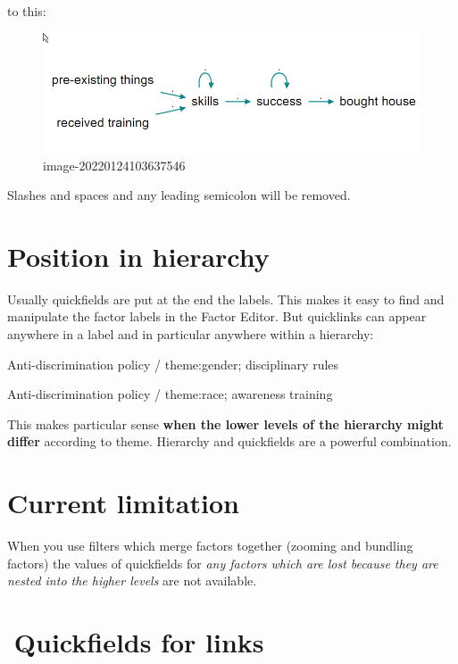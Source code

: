 \documentclass[
]{book}
\begin{document}
to this:

\begin{figure}
\centering
\includegraphics[width=6.77083in,height=\textheight]{_assets/image-20220124103637546.png}
\caption{image-20220124103637546}
\end{figure}

Slashes and spaces and any leading semicolon will be removed.

\hypertarget{position-in-hierarchy}{%
\section{Position in hierarchy}\label{position-in-hierarchy}}

Usually quickfields are put at the end the labels. This makes it easy to find and manipulate the factor labels in the Factor Editor. But quicklinks can appear anywhere in a label and in particular anywhere within a hierarchy:

Anti-discrimination policy / theme:gender; disciplinary rules

Anti-discrimination policy / theme:race; awareness training

This makes particular sense \textbf{when the lower levels of the hierarchy might differ} according to theme. Hierarchy and quickfields are a powerful combination.

\hypertarget{current-limitation}{%
\section{Current limitation}\label{current-limitation}}

When you use filters which merge factors together (zooming and bundling factors) the values of quickfields for \emph{any factors which are lost because they are nested into the higher levels} are not available.

\hypertarget{quickfields-for-links}{%
\section{🧪Quickfields for links}\label{quickfields-for-links}}
\end{document}
